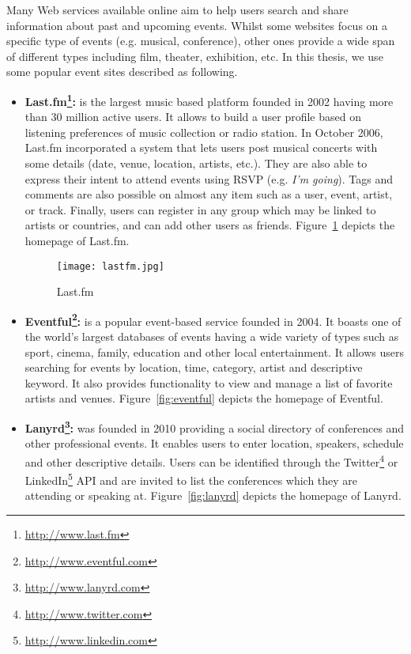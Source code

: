 Many Web services available online aim to help users search and share information about past and upcoming events. Whilst some websites focus on a specific type of events (e.g. musical, conference), other ones provide a wide span of different types including film, theater, exhibition, etc. In this thesis, we use some popular event sites described as following.  

\begin{itemize}
 \item \textbf{Last.fm\footnote{\url{http://www.last.fm}}:} is the largest music based platform founded in 2002 having more than 30 million active users. It allows to build a user profile based on listening preferences of music collection or radio station. In October 2006, Last.fm incorporated a system that lets users post musical concerts with some details (date, venue, location, artists, etc.).  They are also able to express their intent to attend events using RSVP (e.g. \emph{I'm going}). Tags and 
comments are also possible on almost any item such as a user, event, artist, or track. Finally, users can register in any group which may be linked to artists or countries, and can add other users as friends. Figure~\ref{fig:lastfm} depicts the homepage of Last.fm.

\begin{figure}[htbp]
  \centering
  \texttt{[image: lastfm.jpg]}
  \caption{Last.fm}
  \label{fig:lastfm}
\end{figure} 
  
 \item \textbf{Eventful\footnote{\url{http://www.eventful.com}}:} is a popular event-based service founded in 2004. It boasts one of the world's largest databases of events having a wide variety of types such as sport, cinema, family, education and other local entertainment. It allows users searching for events by location, time, category, artist and descriptive keyword. It also provides functionality to view and manage a list of favorite artists and venues. Figure~\ref{fig:eventful} depicts the homepage of Eventful.
 
  \item \textbf{Lanyrd\footnote{\url{http://www.lanyrd.com}}:} was founded in 2010 providing a social directory of conferences and other professional events. It enables users to enter location, speakers, schedule and other descriptive details. Users can be identified through the Twitter\footnote{\url{http://www.twitter.com}} or LinkedIn\footnote{\url{http://www.linkedin.com}} API and are invited to list the conferences which they are attending or speaking at. Figure~\ref{fig:lanyrd} depicts the homepage of Lanyrd.
 

\end{itemize}
